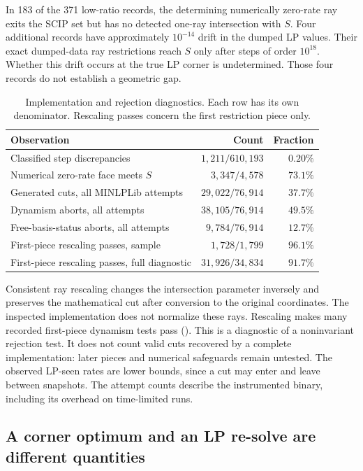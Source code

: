 In 183 of the 371 low-ratio records, the determining numerically zero-rate
ray exits the SCIP set but has no detected one-ray intersection with $S$.
Four additional records have approximately $10^{-14}$ drift in the dumped
LP values. Their exact dumped-data ray restrictions reach $S$ only after
steps of order $10^{18}$. Whether this drift occurs at the true LP corner
is undetermined. Those four records do not establish a geometric gap.

\begin{table}[t]
\centering
\caption{Implementation and rejection diagnostics. Each row has its own
denominator. Rescaling passes concern the first restriction piece only.}
\label{exp:diagnostic-table}
\begin{tabular}{@{}lrr@{}}
\toprule
Observation & Count & Fraction \\
\midrule
Classified step discrepancies & $1,211/610,193$ & $0.20\%$ \\
Numerical zero-rate face meets $S$ & $3,347/4,578$ & $73.1\%$ \\
Generated cuts, all MINLPLib attempts & $29,022/76,914$ & $37.7\%$ \\
Dynamism aborts, all attempts & $38,105/76,914$ & $49.5\%$ \\
Free-basis-status aborts, all attempts & $9,784/76,914$ & $12.7\%$ \\
First-piece rescaling passes, sample & $1,728/1,799$ & $96.1\%$ \\
First-piece rescaling passes, full diagnostic & $31,926/34,834$ & $91.7\%$ \\
\bottomrule
\end{tabular}
\end{table}

Consistent ray rescaling changes the intersection parameter inversely
and preserves the mathematical cut after conversion to the original
coordinates. The inspected implementation does not normalize these rays.
Rescaling makes many recorded first-piece dynamism tests pass
(). This is a diagnostic of a noninvariant
rejection test. It does not count valid cuts recovered by a complete
implementation: later pieces and numerical safeguards remain untested.
The observed LP-seen rates are lower bounds, since a cut may enter and
leave between snapshots. The attempt counts describe the instrumented
binary, including its overhead on time-limited runs.

\subsection{A corner optimum and an LP re-solve are different quantities}
\label{exp:one-cut}


